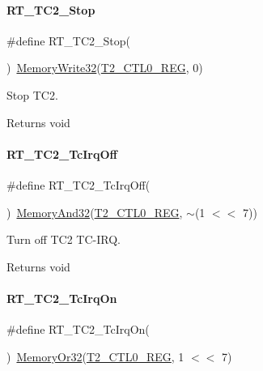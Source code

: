 \paragraph{\texorpdfstring{R\+T\+\_\+\+T\+C2\+\_\+\+Stop}{RT\_TC2\_Stop}}
{\footnotesize\ttfamily \#define R\+T\+\_\+\+T\+C2\+\_\+\+Stop(\begin{DoxyParamCaption}{ }\end{DoxyParamCaption})~\mbox{\hyperlink{a00020_a6b9732365b12e48ddb89fe1028b975b0}{Memory\+Write32}}(\mbox{\hyperlink{a00020_adadaa0ab1ebbd7ba9b70dfd24c3ed44daf2e9deb36631241181cbf09e8d959475}{T2\+\_\+\+C\+T\+L0\+\_\+\+R\+EG}}, 0)}



Stop T\+C2. 

\begin{DoxyReturn}{Returns}
void 
\end{DoxyReturn}
\mbox{\label{a00047_a12e287a7ca5033554b5dc4693a231319}} 
\paragraph{\texorpdfstring{R\+T\+\_\+\+T\+C2\+\_\+\+Tc\+Irq\+Off}{RT\_TC2\_TcIrqOff}}
{\footnotesize\ttfamily \#define R\+T\+\_\+\+T\+C2\+\_\+\+Tc\+Irq\+Off(\begin{DoxyParamCaption}{ }\end{DoxyParamCaption})~\mbox{\hyperlink{a00020_ad87cedffcaadc51db22594fce55173d4}{Memory\+And32}}(\mbox{\hyperlink{a00020_adadaa0ab1ebbd7ba9b70dfd24c3ed44daf2e9deb36631241181cbf09e8d959475}{T2\+\_\+\+C\+T\+L0\+\_\+\+R\+EG}}, $\sim$(1 $<$$<$ 7))}



Turn off T\+C2 T\+C-\/\+I\+RQ. 

\begin{DoxyReturn}{Returns}
void 
\end{DoxyReturn}
\mbox{\label{a00047_a0d385385ff809f653b9e7a6d6a111838}} 
\paragraph{\texorpdfstring{R\+T\+\_\+\+T\+C2\+\_\+\+Tc\+Irq\+On}{RT\_TC2\_TcIrqOn}}
{\footnotesize\ttfamily \#define R\+T\+\_\+\+T\+C2\+\_\+\+Tc\+Irq\+On(\begin{DoxyParamCaption}{ }\end{DoxyParamCaption})~\mbox{\hyperlink{a00020_a27874a97deab7cecdde5ddecf466e31e}{Memory\+Or32}}(\mbox{\hyperlink{a00020_adadaa0ab1ebbd7ba9b70dfd24c3ed44daf2e9deb36631241181cbf09e8d959475}{T2\+\_\+\+C\+T\+L0\+\_\+\+R\+EG}}, 1 $<$$<$ 7)}



